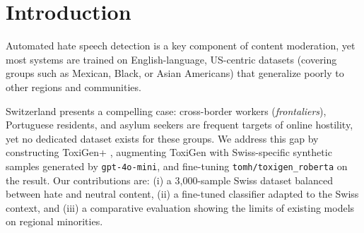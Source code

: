\documentclass{article}
\begin{document}

\printAffiliationsAndNotice{}

\begin{abstract}
Hate speech detection systems are predominantly trained on US-centric datasets, leaving regional minorities from other countries underrepresented. We extend the ToxiGen benchmark to three Swiss-specific groups (cross-border workers, Portuguese residents, asylum seekers), generate synthetic samples with \texttt{gpt-4o-mini}, and fine-tune \texttt{tomh/toxigen\_roberta} on the resulting dataset, ToxiGen+. The baseline achieves only 26\% hate-class recall on Swiss content; fine-tuning on ToxiGen+ raises macro F1 to 0.998 with near-perfect hate recall.

\textbf{Keywords:}

\end{abstract}
\section{Introduction}
\label{sec:intro}

Automated hate speech detection is a key component of content moderation, yet most systems are trained on English-language, US-centric datasets (covering groups such as Mexican, Black, or Asian Americans) that generalize poorly to other regions and communities.

Switzerland presents a compelling case: cross-border workers (\textit{frontaliers}), Portuguese residents, and asylum seekers are frequent targets of online hostility, yet no dedicated dataset exists for these groups. We address this gap by constructing ToxiGen+ \cite{hartvigsen2022toxigen}, augmenting ToxiGen with Swiss-specific synthetic samples generated by \texttt{gpt-4o-mini}, and fine-tuning \texttt{tomh/toxigen\_roberta} on the result. Our contributions are: (i) a 3,000-sample Swiss dataset balanced between hate and neutral content, (ii) a fine-tuned classifier adapted to the Swiss context, and (iii) a comparative evaluation showing the limits of existing models on regional minorities.
\end{document}
